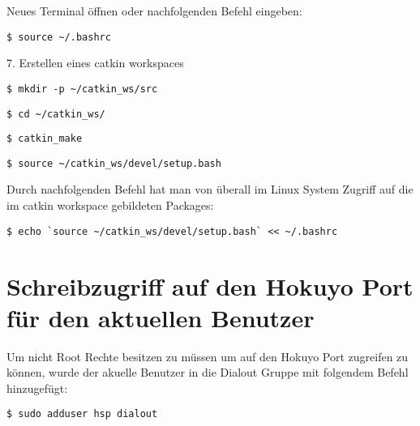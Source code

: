 Neues Terminal öffnen oder nachfolgenden Befehl eingeben:\\

\begin{lstlisting}
$ source ~/.bashrc
\end{lstlisting}
\vspace{-0.8cm}

7. Erstellen eines catkin workspaces \\

\begin{lstlisting}
$ mkdir -p ~/catkin_ws/src
\end{lstlisting}

\begin{lstlisting}
$ cd ~/catkin_ws/
\end{lstlisting}

\begin{lstlisting}
$ catkin_make
\end{lstlisting}

\begin{lstlisting}
$ source ~/catkin_ws/devel/setup.bash
\end{lstlisting}
\vspace{-0.8cm}

Durch nachfolgenden Befehl hat man von überall im Linux System Zugriff auf die im catkin workspace gebildeten Packages:\\ 

\begin{lstlisting}
$ echo `source ~/catkin_ws/devel/setup.bash` << ~/.bashrc
\end{lstlisting}







\section{Schreibzugriff auf den Hokuyo Port für den aktuellen Benutzer}
Um nicht Root Rechte besitzen zu müssen um auf den Hokuyo Port zugreifen zu können, wurde der akuelle Benutzer in die Dialout Gruppe mit folgendem Befehl hinzugefügt:\\

\begin{lstlisting}
$ sudo adduser hsp dialout
\end{lstlisting}

\vspace{-1.2cm}










